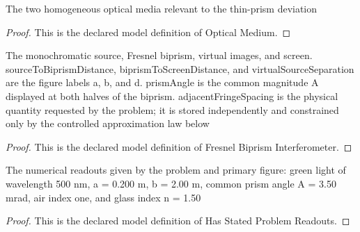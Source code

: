 \begin{definition}
  \label{def:physics:phyx-mini-0121:phyxminiproblems-problemphyxmini0121-opticalmedium}
  The two homogeneous optical media relevant to the thin-prism deviation
\end{definition}
\begin{proof}
  This is the declared model definition of Optical Medium.
\end{proof}
\begin{definition}
  \label{def:physics:phyx-mini-0121:phyxminiproblems-problemphyxmini0121-fresnelbiprisminterferometer}
  The monochromatic source, Fresnel biprism, virtual images, and screen. sourceToBiprismDistance, biprismToScreenDistance, and virtualSourceSeparation are the figure labels a, b, and d. prismAngle is the common magnitude A displayed at both halves of the biprism. adjacentFringeSpacing is the physical quantity requested by the problem; it is stored independently and constrained only by the controlled approximation law below
\end{definition}
\begin{proof}
  This is the declared model definition of Fresnel Biprism Interferometer.
\end{proof}
\begin{definition}
  \label{def:physics:phyx-mini-0121:phyxminiproblems-problemphyxmini0121-hasstatedproblemreadouts}
  The numerical readouts given by the problem and primary figure: green light of wavelength 500 nm, a = 0.200 m, b = 2.00 m, common prism angle A = 3.50 mrad, air index one, and glass index n = 1.50
\end{definition}
\begin{proof}
  This is the declared model definition of Has Stated Problem Readouts.
\end{proof}
